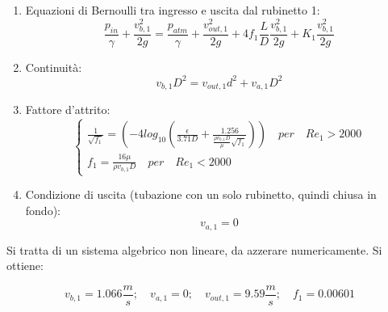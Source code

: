 \documentclass[oneside]{article}
\begin{document}
\begin{enumerate}
   \item Equazioni di Bernoulli tra ingresso e uscita dal rubinetto 1:
      \begin{equation*}
         \frac{p_{in}}{\gamma} + \frac{v_{b,1}^{2}}{2g} = \frac{p_{atm}}{\gamma} +
         \frac{v_{out,1}^{2}}{2g} + 4f_{1}\frac{L}{D}\frac{v_{b,1}^{2}}{2g} +
         K_{1}\frac{v_{b,1}^{2}}{2g}
      \end{equation*}

   \item Continuità:
      \begin{equation*}
         v_{b,1}D^{2} = v_{out,1}d^{2} + v_{a,1}D^{2}
      \end{equation*}

   \item Fattore d'attrito:
      \begin{equation*}
         \begin{cases}
            \frac{1}{\sqrt{f_{1}}} =
            \left(-4log_{10}\left(\frac{\epsilon}{3.71D}+\frac{1.256}{\frac{\rho
            v_{b,1}D}{\mu}\sqrt{f_{1}}}\right)\right) \quad per \quad Re_{1} > 2000 \\
            f_{1} = \frac{16 \mu}{\rho v_{b,1}D} \quad per \quad Re_{1} < 2000
         \end{cases}
      \end{equation*}

   \item Condizione di uscita (tubazione con un solo rubinetto, quindi chiusa in fondo):
      \begin{equation*}
         v_{a,1} = 0
      \end{equation*}
\end{enumerate}

Si tratta di un sistema algebrico non lineare, da azzerare numericamente. Si ottiene:

\begin{equation*}
    v_{b,1} = 1.066\frac{m}{s}; \quad v_{a,1} = 0; \quad v_{out,1} = 9.59\frac{m}{s};
    \quad f_{1} = 0.00601
\end{equation*}
\end{document}
